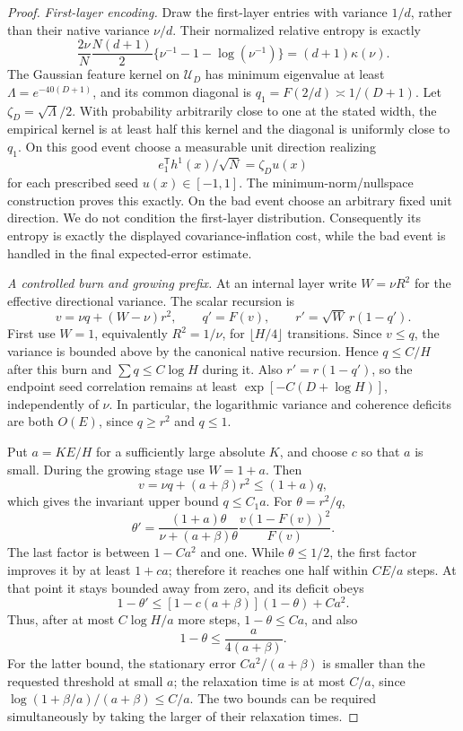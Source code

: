 \begin{proof}
\emph{First-layer encoding.}
Draw the first-layer entries with variance $1/d$, rather than their native variance $\nu/d$. Their normalized relative entropy is exactly
\[
 \frac{2\nu}{N}\frac{N(d+1)}2
       \{\nu^{-1}-1-\log(\nu^{-1})\}
       =(d+1)\kappa(\nu).
\]
The Gaussian feature kernel on $\mathcal U_D$ has minimum eigenvalue at least $\Lambda=e^{-40(D+1)}$, and its common diagonal is $q_1=F(2/d)\asymp1/(D+1)$. Let $\zeta_D=\sqrt\Lambda/2$. With probability arbitrarily close to one at the stated width, the empirical kernel is at least half this kernel and the diagonal is uniformly close to $q_1$. On this good event choose a measurable unit direction realizing
\[
 e_1^{\mathsf T}h^1(x)/\sqrt N=\zeta_Du(x)
\]
for each prescribed seed $u(x)\in[-1,1]$. The minimum-norm/nullspace construction proves this exactly. On the bad event choose an arbitrary fixed unit direction. We do not condition the first-layer distribution. Consequently its entropy is exactly the displayed covariance-inflation cost, while the bad event is handled in the final expected-error estimate.

\emph{A controlled burn and growing prefix.}
At an internal layer write $W=\nu R^2$ for the effective directional variance. The scalar recursion is
\[
 v=\nu q+(W-\nu)r^2,\qquad q'=F(v),\qquad
 r'=\sqrt W\,r(1-q').
\]
First use $W=1$, equivalently $R^2=1/\nu$, for $\lfloor H/4\rfloor$ transitions. Since $v\le q$, the variance is bounded above by the canonical native recursion. Hence $q\le C/H$ after this burn and $\sum q\le C\log H$ during it. Also $r'=r(1-q')$, so the endpoint seed correlation remains at least $\exp[-C(D+\log H)]$, independently of $\nu$. In particular, the logarithmic variance and coherence deficits are both $O(E)$, since $q\ge r^2$ and $q\le1$.

Put $a=KE/H$ for a sufficiently large absolute $K$, and choose $c$ so that $a$ is small. During the growing stage use $W=1+a$. Then
\[
 v=\nu q+(a+\beta)r^2\le(1+a)q,
\]
which gives the invariant upper bound $q\le C_1a$. For $\theta=r^2/q$,
\[
 \theta'=\frac{(1+a)\theta}{\nu+(a+\beta)\theta}
                  \frac{v(1-F(v))^2}{F(v)}.
\]
The last factor is between $1-Ca^2$ and one. While $\theta\le1/2$, the first factor improves it by at least $1+ca$; therefore it reaches one half within $CE/a$ steps. At that point it stays bounded away from zero, and its deficit obeys
\[
 1-\theta'\le[1-c(a+\beta)](1-\theta)+Ca^2.
\]
Thus, after at most $C\log H/a$ more steps, $1-\theta\le Ca$, and also
\[
 1-\theta\le \frac{a}{4(a+\beta)}.
\]
For the latter bound, the stationary error $Ca^2/(a+\beta)$ is smaller than the requested threshold at small $a$; the relaxation time is at most $C/a$, since $\log(1+\beta/a)/(a+\beta)\le C/a$. The two bounds can be required simultaneously by taking the larger of their relaxation times.


\end{proof}
